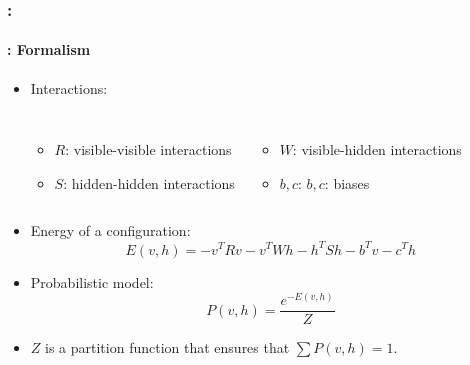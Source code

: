 \documentclass[xcolor=table]{beamer}
\begin{document}
	\begin{frame}
		\frametitle{\insertshortsubtitle: \insertsection}
		\framesubtitle{\insertsubsection: Formalism}
		
		\begin{itemize}
			\item Interactions:
			\begin{columns}
				\begin{itemize}
					\item $R$: visible-visible interactions
					\item $S$: hidden-hidden interactions
				\end{itemize}
				
				\begin{itemize}
					\item $W$: visible-hidden interactions
					\item $b, c$: $b, c$: biases
				\end{itemize}
			\end{columns}
			
			\vskip0.5cm
			\item Energy of a configuration:
			\[
			E(v,h) = - v^T R v - v^T W h - h^T S h - b^T v - c^T h
			\]
			
			\item Probabilistic model:
			\[
			P(v,h) = \frac{e^{-E(v,h)}}{Z} 
			\]
			
			\item $Z$ is a partition function that ensures that $\sum P(v,h) = 1$.
			
		\end{itemize}
		
	\end{frame}
	
\end{document}
